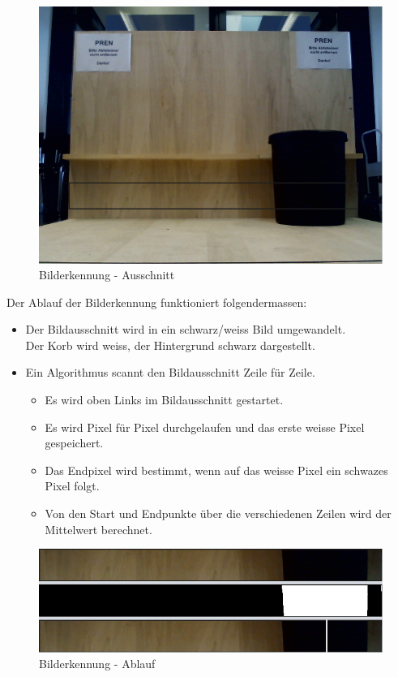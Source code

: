 \begin{figure}[h!]          
	\centering             
	\includegraphics[width=1\textwidth]{fig/BildMitKorb_markiert.png}
	\caption{Bilderkennung - Ausschnitt}
	\label{fig:Bilderkennung_ausschnitt}        
\end{figure}

Der Ablauf der Bilderkennung funktioniert folgendermassen:
\begin{itemize}
	\item Der Bildausschnitt wird in ein schwarz/weiss Bild umgewandelt. \\
        Der Korb wird weiss, der Hintergrund schwarz dargestellt. 
	\item Ein Algorithmus scannt den Bildausschnitt Zeile für Zeile.
    \begin{itemize}
	    \item Es wird oben Links im Bildausschnitt gestartet.
	    \item Es wird Pixel für Pixel durchgelaufen und das erste weisse Pixel gespeichert.
	    \item Das Endpixel wird bestimmt, wenn auf das weisse Pixel ein schwazes Pixel folgt.
	    \item Von den Start und Endpunkte über die verschiedenen Zeilen wird der Mittelwert berechnet.
    \end{itemize}
\end{itemize}

\begin{figure}[h!]          
	\centering             
	\includegraphics[width=1\textwidth]{fig/Korberkennung_Schritte.png}
	\caption{Bilderkennung - Ablauf}
	\label{fig:Bilderkennung_ablauf}        
\end{figure}

